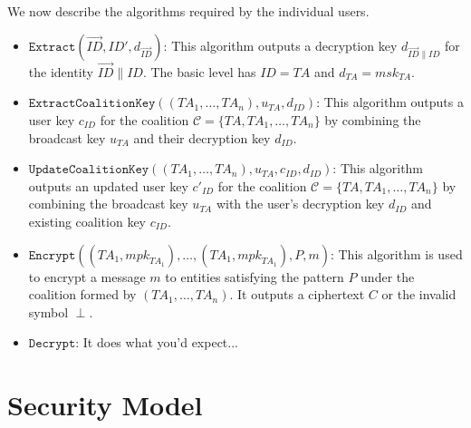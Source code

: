 \documentclass[10pt]{article}
\newcommand{\ID}{\mathit{ID}}
\newcommand{\TA}{\mathit{TA}}
\newcommand{\mpk}{\mathit{mpk}}
\newcommand{\msk}{\mathit{msk}}
\begin{document}
We now describe the algorithms required by the individual users.
\begin{itemize}
\item $\texttt{Extract}(\vec{ID},\ID',d_{\vec{\ID}})$: This
algorithm outputs a decryption key $d_{\vec{\ID}\|\ID}$ for the
identity $\vec{\ID} \| \ID$. The basic level has $\ID=\TA$ and
$d_{\TA}=\msk_{\TA}$. \medskip

\item
$\texttt{ExtractCoalitionKey}((\TA_{1},\ldots,\TA_{n}),u_{\TA},d_{\ID})$:
This algorithm outputs a user key $c_{\ID}$ for the coalition
$\mathcal{C}=\{\TA,\TA_{1},\ldots,\TA_{n}\}$ by combining the
broadcast key $u_{\TA}$ and their decryption key $d_{\ID}$.\medskip

\item $\texttt{UpdateCoalitionKey}((\TA_{1},\ldots,\TA_{n}),u_{\TA},c_{\ID},d_{\ID})$:
This algorithm outputs an updated user key $c'_{\ID}$ for the
coalition $\mathcal{C}=\{\TA,\TA_{1},\ldots,\TA_{n}\}$ by combining
the broadcast key $u_{\TA}$ with the user's decryption key $d_{\ID}$
and existing coalition key $c_{\ID}$.\medskip

\item $\texttt{Encrypt}((\TA_{1},\mpk_{\TA_{1}}),\ldots,(\TA_{1},\mpk_{\TA_{1}}),\mathit{P},m)$:
This algorithm is used to encrypt a message $m$ to entities
satisfying the pattern $\mathit{P}$ under the coalition formed by
$(\TA_{1},\ldots,\TA_{n})$. It outputs a ciphertext $C$ or the
invalid symbol $\perp$.
\medskip

\item $\texttt{Decrypt}$: It does what you'd expect...
\end{itemize}

\section{Security Model}
\end{document}
